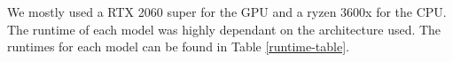 We mostly used a RTX 2060 super for the GPU and a ryzen 3600x for the CPU. The runtime of each model was highly dependant on the architecture used. The runtimes for each model can be found in Table \ref{runtime-table}.


